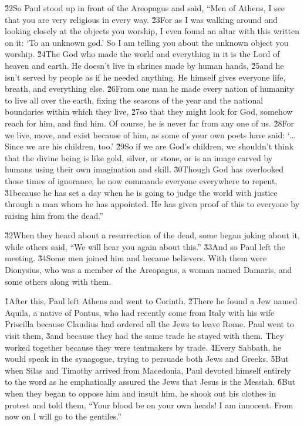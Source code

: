 \v{22}So Paul stood up in front of the Areopagus and said, ``Men of Athens, I see that you are very religious in every way. \v{23}For as I was walking around and looking closely at the objects you worship, I even found an altar with this written on it: `To an unknown god.' So I am telling you about the unknown object you worship. \v{24}The God who made the world and everything in it is the Lord of heaven and earth. He doesn't live in shrines made by human hands, \v{25}and he isn't served by people as if he needed anything. He himself gives everyone life, breath, and everything else. \v{26}From one man he made every nation of humanity to live all over the earth, fixing the seasons of the year and the national boundaries within which they live, \v{27}so that they might look for God, somehow reach for him, and find him. Of course, he is never far from any one of us. \v{28}For we live, move, and exist because of him, as some of your own poets have said: `{\ldots}Since we are his children, too.' \v{29}So if we are God's children, we shouldn't think that the divine being is like gold, silver, or stone, or is an image carved by humans using their own imagination and skill. \v{30}Though God has overlooked those times of ignorance, he now commands everyone everywhere to repent, \v{31}because he has set a day when he is going to judge the world with justice through a man whom he has appointed. He has given proof of this to everyone by raising him from the dead.''

\v{32}When they heard about a resurrection of the dead, some began joking about it, while others said, ``We will hear you again about this.'' \v{33}And so Paul left the meeting. \v{34}Some men joined him and became believers. With them were Dionysius, who was a member of the Areopagus, a woman named Damaris, and some others along with them.

\v{1}After this, Paul left Athens and went to Corinth. \v{2}There he found a Jew named Aquila, a native of Pontus, who had recently come from Italy with his wife Priscilla because Claudius had ordered all the Jews to leave Rome. Paul went to visit them, \v{3}and because they had the same trade he stayed with them. They worked together because they were tentmakers by trade. \v{4}Every Sabbath, he would speak in the synagogue, trying to persuade both Jews and Greeks. \v{5}But when Silas and Timothy arrived from Macedonia, Paul devoted himself entirely to the word as he emphatically assured the Jews that Jesus is the Messiah. \v{6}But when they began to oppose him and insult him, he shook out his clothes in protest and told them, ``Your blood be on your own heads! I am innocent. From now on I will go to the gentiles.''

